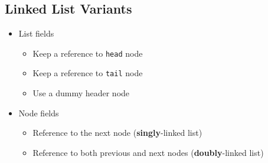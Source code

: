 \documentclass[10pt]{article}
\begin{document}
\subsection*{Linked List Variants}
\begin{itemize}
    \item List fields
    \begin{itemize}
        \item Keep a reference to \texttt{head} node
        \item Keep a reference to \texttt{tail} node
        \item Use a dummy header node
    \end{itemize}
    \item Node fields
    \begin{itemize}
        \item Reference to the next node (\textbf{singly}-linked list)
        \item Reference to both previous and next nodes (\textbf{doubly}-linked list)
    \end{itemize}
\end{itemize}
\end{document}
